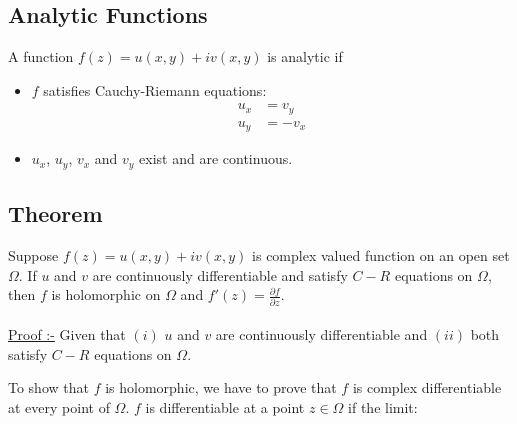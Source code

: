 \documentclass{article}
\begin{document}
\subsection{Analytic Functions}
A function $f(z)=u(x,y)+iv(x,y)$ is analytic if
\begin{itemize}
    \item $f$ satisfies Cauchy-Riemann equations:
    \begin{align}
        u_x&=v_y \\
        u_y&=-v_x
    \end{align}
    \item $u_x$, $u_y$, $v_x$ and $v_y$ exist and are continuous.
\end{itemize}
\subsection{Theorem}
Suppose $f(z)=u(x,y)+iv(x,y)$ is complex valued function on an open set $\Omega$. If $u$ and $v$ are continuously differentiable and satisfy $C-R$ equations on $\Omega$, then $f$ is holomorphic on $\Omega$ and $f'(z)=\frac{\partial f}{\partial z}$.
\\
\\
\underline{Proof :-} Given that $(i)$ $u$ and $v$ are continuously differentiable and $(ii)$ both satisfy $C-R$ equations on $\Omega$.
\begin{center}
    To show that $f$ is holomorphic, we have to prove that $f$ is complex differentiable at every point of $\Omega$. $f$ is differentiable at a point $z\in \Omega$ if the limit:

\end{center}
\end{document}
